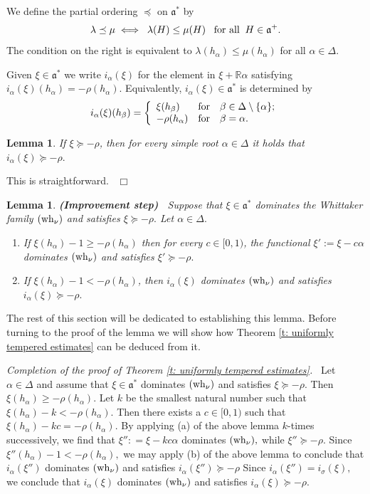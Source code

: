 \documentclass[12pt,a4paper]{article}
\newtheorem{Lemma}[Thm]{Lemma}
\newenvironment{lemma}[0]{\begin{Lemma}\noindent}%
{\end{Lemma}}
\def\proof{\par\noindent{\it Proof.}{\ }{\ }}
\def\qed{~\hfill\hbox{$\Box$}\medbreak}
\def\medno{\medbreak\noindent}
\def\itema{\vspace{-1mm}\item[{\rm (a)}]}
\def\itemb{\item[{\rm (b)}]}
\def\msy#1{{\mathbb #1}}
\def\R{{\msy R}}
\def\ga{\alpha}
\def\gb{\beta}
\def\gl{\lambda}
\def\gs{\sigma}
\def\gD{\Delta}
\def\got#1{\mathfrak #1}
\def\fa{{\got a}}
\numberwithin{Thm}{section}
\numberwithin{equation}{section}
\numberwithin{equation}{section}
\def\fad{{\fa^*}}
\def\wh{{\rm wh}}
\def\xxi{\xi}
\begin{document}
 We define the partial ordering $\preceq $ on $\fad$ by 
 \begin{equation}
 \label{e: defi majorisation} 
 \gl \preceq \mu \iff \;\gl(H) \leq \mu(H) \;\;\;\mbox{\rm for all}\;\; H \in \fa^+.
 \end{equation}
 The condition on the right is equivalent to 
 $\gl(h_\ga) \leq \mu(h_\ga)$ for all $\ga \in \gD.$ 
  
 Given $\xxi \in \fad$ we write $i_\ga(\xxi)$ for the element in $\xxi + \R \ga$ 
satisfying  $i_\ga(\xxi)(h_\ga)=  -\rho(h_\ga).$  Equivalently, $i_\ga(\xxi) \in \fad$ is determined by
$$
i_\ga(\xxi)(h_\gb) = \left\{ 
\begin{array}{lll}
\xxi(h_\gb) & {\rm for} & \gb \in \gD\setminus \{\ga\};\\
-\rho(h_\ga) & {\rm for }&  \gb = \ga.
\end{array}
\right.
$$ 

\begin{lemma}
\label{l: i ga eta majorizes min rho}
If $\xxi \succeq -\rho$, then for every simple root $\ga \in \gD$ it holds that 
$i_\ga(\xxi) \succeq -\rho.$ 
\end{lemma}

\proof 
This is straightforward.
\qed

\begin{lemma}
\label{l: improvement step}
{\bf (Improvement step)\ } 
Suppose that $\xxi \in \fad$ dominates the Whittaker family $(\wh_\nu)$ 
and satisfies  $\xxi \succeq -\rho.$ Let $\ga \in \gD.$ 
\begin{enumerate}
\itema If $\xxi(h_\ga) - 1 \geq - \rho(h_\ga)$ then for every $c \in [0,1)$, 
the functional $\xxi':= \xxi - c\ga$ dominates $(\wh_\nu)$ and satisfies   $\xxi' \succeq -\rho.$ 
\itemb If $\xxi(h_\ga) -1  <  - \rho(h_\ga)$, then $i_\ga(\xxi)$ dominates $(\wh_\nu)$ 
and satisfies $i_\ga(\xxi) \succeq - \rho.$ 
\end{enumerate} 
\end{lemma}
\medno
The rest of this section will be dedicated to establishing this lemma. Before turning to the proof of 
the lemma we will show
how Theorem  \ref{t: uniformly tempered estimates} can be deduced from it.
\medbreak

{\em Completion of the proof of Theorem  \ref{t: uniformly tempered estimates}.\ }
Let $\ga \in \gD$ and assume that $\xxi\in \fad$ dominates $(\wh_\nu)$ and satisfies 
$\xxi \succeq -\rho.$ Then $\xxi(h_\ga) \geq  - \rho(h_\ga).$ Let $k$ be the smallest natural number 
such that $\xxi(h_\ga) - k < -\rho(h_\ga).$ Then there exists a $c \in [0,1)$ such that 
$\xxi(h_\ga) - kc =  -\rho(h_\ga).$ By applying (a) of the above lemma $k$-times
successively, we find that $\xxi'': = \xxi - kc\ga $ dominates $(\wh_\nu),$ while $\xxi'' \succeq -\rho.$  Since $\xxi''(h_\ga) - 1 < - \rho(h_\ga),$ we may apply (b) of the above lemma
to conclude that $i_\ga(\xxi'')$ dominates $(\wh_\nu)$ and satisfies $i_\ga(\xxi'') \succeq -\rho$ 
Since $i_\ga(\xxi'') = i_\gs(\xxi),$ we conclude that $i_\ga(\xxi)$ 
dominates $(\wh_\nu)$ and satisfies $i_\ga(\xxi) \succeq -\rho.$
\end{document}
